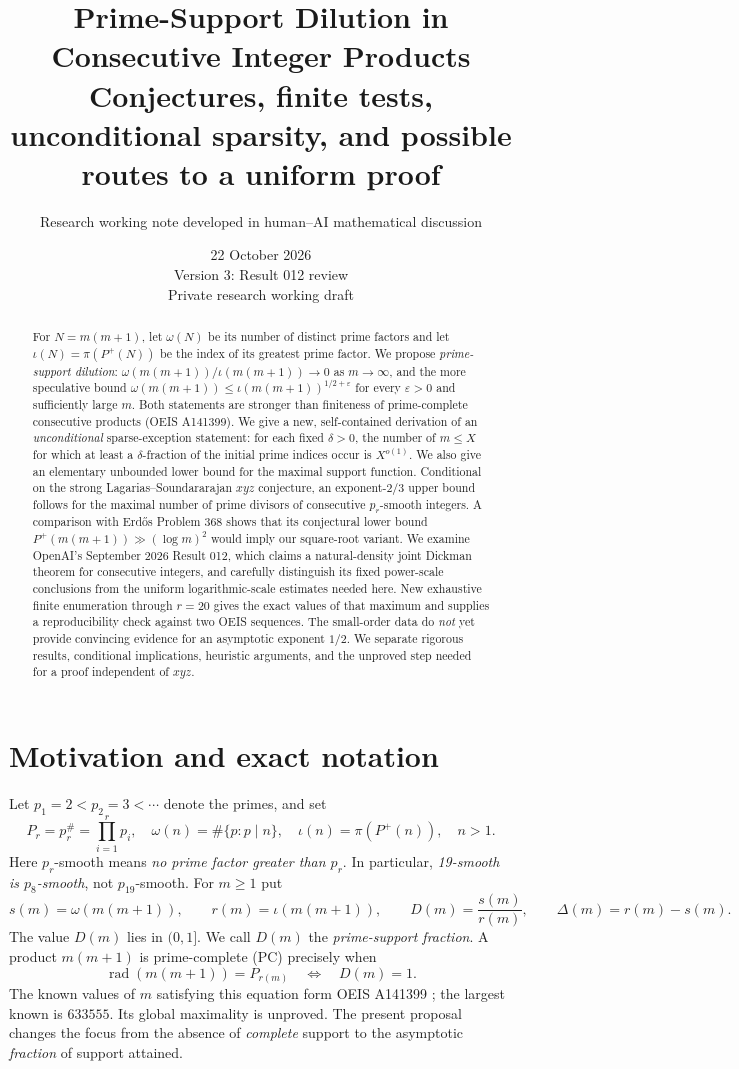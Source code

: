 \documentclass[11pt,letterpaper]{article}
\title{\bfseries Prime-Support Dilution in Consecutive Integer Products\\[4pt]
\large Conjectures, finite tests, unconditional sparsity, and possible routes to a uniform proof}
\author{Research working note developed in human--AI mathematical discussion}
\date{22 October 2026\\Version 3: Result 012 review\\Private research working draft}
\theoremstyle{remark}
\newcommand{\GPF}{P^{+}}
\newcommand{\rad}{\operatorname{rad}}
\newcommand{\iiota}{\iota}
\newcommand{\Om}{\omega}
\begin{document}
\maketitle
\begin{abstract}
For $N=m(m+1)$, let $\Om(N)$ be its number of distinct prime factors and let
$\iiota(N)=\pi(\GPF(N))$ be the index of its greatest prime factor. We propose
\emph{prime-support dilution}: $\Om(m(m+1))/\iiota(m(m+1))\to0$ as
$m\to\infty$, and the more speculative bound
$\Om(m(m+1))\le\iiota(m(m+1))^{1/2+\varepsilon}$ for every
$\varepsilon>0$ and sufficiently large $m$.
Both statements are stronger than finiteness of prime-complete consecutive
products (OEIS A141399). We give a new, self-contained derivation of an
\emph{unconditional} sparse-exception statement: for each fixed $\delta>0$,
the number of $m\le X$ for which at least a $\delta$-fraction of the initial
prime indices occur is $X^{o(1)}$. We also give an elementary unbounded lower
bound for the maximal support function. Conditional on the strong
Lagarias--Soundararajan $xyz$ conjecture, an exponent-$2/3$ upper bound follows
for the maximal number of prime divisors of consecutive $p_r$-smooth integers.
A comparison with Erd\H{o}s Problem 368 shows that its conjectural lower bound
$P^+(m(m+1))\gg(\log m)^2$ would imply our square-root variant.
We examine OpenAI's September 2026 Result 012, which claims a natural-density
joint Dickman theorem for consecutive integers, and carefully distinguish its
fixed power-scale conclusions from the uniform logarithmic-scale estimates
needed here. New exhaustive finite enumeration through $r=20$ gives the exact values of that
maximum and supplies a reproducibility check against two OEIS sequences.
The small-order data do \emph{not} yet provide convincing evidence for an
asymptotic exponent $1/2$. We separate rigorous results, conditional
implications, heuristic arguments, and the unproved step needed for a proof
independent of $xyz$.
\end{abstract}

\section{Motivation and exact notation}
Let $p_1=2<p_2=3<\cdots$ denote the primes, and set
\[
  P_r=p_r^\#=\prod_{i=1}^r p_i,\quad
  \Om(n)=\#\{p:p\mid n\},\quad
  \iiota(n)=\pi(\GPF(n)),\quad n>1.
\]
Here $p_r$-smooth means \emph{no prime factor greater than $p_r$}.
In particular, \emph{19-smooth is $p_8$-smooth}, not $p_{19}$-smooth.
For $m\ge1$ put
\[
 s(m)=\Om(m(m+1)),\qquad r(m)=\iiota(m(m+1)),\qquad
 D(m)=\frac{s(m)}{r(m)},\qquad \Delta(m)=r(m)-s(m).
\]
The value $D(m)$ lies in $(0,1]$. We call $D(m)$ the \emph{prime-support
fraction}. A product $m(m+1)$ is prime-complete (PC) precisely when
\[
\rad(m(m+1))=P_{r(m)} \quad\Longleftrightarrow\quad D(m)=1.
\]
The known values of $m$ satisfying this equation form OEIS A141399
\cite{A141399}; the largest known is $633555$. Its global maximality is
unproved. The present proposal changes the focus from the absence of
\emph{complete} support to the asymptotic \emph{fraction} of support attained.
\end{document}
